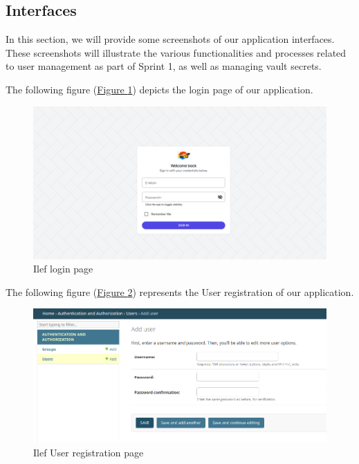 \subsection{Interfaces}
In this section, we will provide some screenshots of our application interfaces. These screenshots will illustrate the various functionalities and processes related to user management as part of Sprint 1, as well as managing vault secrets. 

The following figure (\hyperref[fig:login_sprint]{Figure \ref{fig:login_sprint}})  depicts the login page of our application.
\begin{figure}[h]
  \center
  \includegraphics[width=14cm]{./chapters/sprint1/login.png}
  \caption{Ilef login page}
  \label{fig:login_sprint}
\end{figure}



The following figure (\hyperref[fig:add_user]{Figure \ref{fig:add_user}}) represents the User registration of our application.

\begin{figure}[h]
  \center
  \includegraphics[width=15cm]{./chapters/sprint1/add_user.png}
  \caption{Ilef User registration page}
  \label{fig:add_user}
\end{figure}

